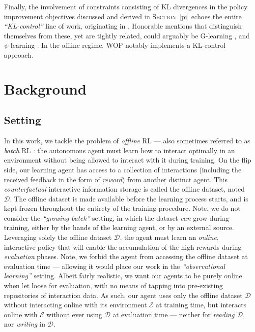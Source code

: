 Finally, the involvement of constraints consisting of KL divergences in the policy improvement objectives
discussed and derived in \textsc{Section}~\ref{pi} echoes the entire \textit{``KL-control''} line of work,
originating in \cite{Kakade2001-hw, Kakade2002-kw, Kober2008-wb, Peters2008-mw, Vlassis2009-kc,
Theodorou2010-yy, Furmston2010-nz, Peters2010-vd, Kober2010-hy, Neumann2011-hn, Kappen2012-hp}.
Honorable mentions that distinguish themselves from these,
yet are tightly related,
could arguably be G-learning \cite{Fox2015-fr},
and $\psi$-learning \cite{Rawlik2013-cf}.
In the offline regime, WOP \cite{Jaques2020-gb}
notably implements a KL-control approach.

\section{Background}
\label{bg}

\subsection*{Setting}

In this work, we tackle the problem of \emph{offline} RL
--- also sometimes referred to as \emph{batch} RL \cite{Lange2012-cc}:
the autonomous agent must learn how to interact optimally in an environment without being allowed to
interact with it during training.
On the flip side, our learning agent has access to a collection of interactions (including the received feedback
in the form of \emph{reward})
from another distinct agent.
This \emph{counterfactual} interactive information storage is called the offline dataset, noted $\mathcal{D}$.
The offline dataset is made available before the learning process starts, and is kept frozen throughout the
entirety of the training procedure. Note, we do not consider the \textit{``growing batch''} setting, in which
the dataset \emph{can} grow during training, either by the hands of the learning agent, or by an external source.
Leveraging solely the offline dataset $\mathcal{D}$,
the agent must learn an \emph{online}, interactive
policy that will enable the accumulation of the high rewards during \emph{evaluation} phases.
Note, we forbid the agent from accessing the offline dataset at evaluation time --- allowing it would place our
work in the \textit{``observational learning''} setting.
Albeit fairly realistic, we want our agents to be purely online when let loose for evaluation,
with no means of tapping into pre-existing repositories of interaction data.
As such, our agent uses only the offline dataset $\mathcal{D}$
without interacting online with its environment $\mathcal{E}$
at training time, but interacts online with $\mathcal{E}$
without ever using $\mathcal{D}$ at evaluation time
--- neither for \textit{reading} $\mathcal{D}$, nor \textit{writing} in $\mathcal{D}$.

